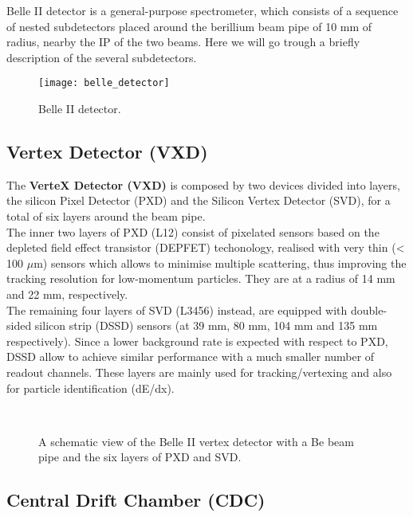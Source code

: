 Belle II detector is a general-purpose spectrometer, which consists of a sequence of nested subdetectors placed around the berillium beam pipe of 10 mm of radius, nearby the IP of the two beams. Here we will go trough a briefly description of the several subdetectors. 

\begin{figure}[h!]
\centering
\texttt{[image: belle\_detector]}
\caption{Belle II detector.}
\label{fig:belle_detector}
\end{figure}


\subsection{Vertex Detector (VXD)}


The \textbf{VerteX Detector (VXD)} is composed by two devices divided into layers, the silicon Pixel Detector (PXD) and the Silicon Vertex Detector (SVD), for a total of six layers around the beam pipe.\\
The inner two layers of PXD (L12) consist of pixelated sensors based on the depleted field effect transistor (DEPFET) techonology, realised with very thin (< 100 $\mu$m) sensors which allows to minimise multiple scattering, thus improving the tracking resolution for low-momentum particles. They are at a radius of 14 mm and 22 mm, respectively. \\
The remaining four layers of SVD (L3456) instead, are equipped with double-sided silicon strip (DSSD) sensors (at 39 mm, 80 mm, 104 mm and 135 mm respectively). Since a lower background rate is expected with respect to PXD, DSSD allow to achieve similar performance with a much smaller number of readout channels.
These layers are mainly used for tracking/vertexing and also for particle identification (dE/dx). 

\begin{figure}[h!]
\centering
{}\quad
{}\\
\caption{A schematic view of the Belle II vertex detector with a Be beam pipe and the six layers of PXD and SVD.}
\label{fig:VXD}
\end{figure}


\subsection{Central Drift Chamber (CDC)}

